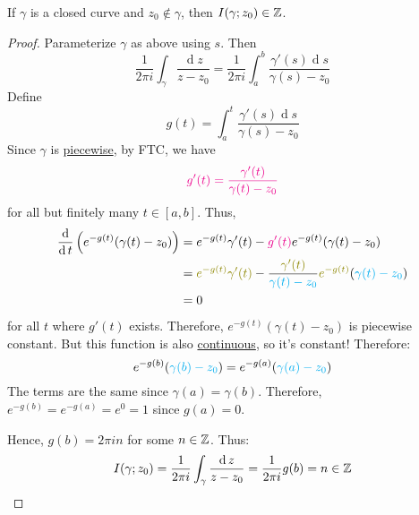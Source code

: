 \documentclass[12pt]{article}
\renewcommand{\d}{\ensuremath{\operatorname{d}}}
\begin{document}
\begin{lemma}
    If $\gamma$ is a closed curve and $z_0\notin \gamma$, then $I(\gamma;z_0)\in \mathbb{Z}$.
\end{lemma}
\begin{proof}
    Parameterize $\gamma$ as above using $s$. Then \[\frac{1}{2\pi i}\int_{\gamma}\frac{\d z}{z-z_0} = \frac{1}{2\pi i}\int_{a}^{b}\frac{\gamma'(s)\d s}{\gamma(s)-z_0}\]
    Define \[g(t)=\int_{a}^{t}\frac{\gamma'(s)\d s}{\gamma(s)-z_0}\]
    Since $\gamma$ is \underline{piecewise}, by FTC, we have \[\textcolor{magenta}{g'(t)=\frac{\gamma'(t)}{\gamma(t)-z_0}}\] for all but finitely many $t\in[a,b]$. Thus, \begin{align*}
        \frac{\d}{\d t}\left(e^{-g(t)}(\gamma(t)-z_0)\right) &= e^{-g(t)}\gamma'(t)-\rt{g'(t)}e^{-g(t)}(\gamma(t)-z_0)\\
        &= \gt{e^{-g(t)}\gamma'(t)}-\frac{\gt{\gamma'(t)}}{\bt{\gamma(t)-z_0}}\gt{e^{-g(t)}}(\bt{\gamma(t)-z_0})\\
        &= 0
    \end{align*}
    for all $t$ where $g'(t)$ exists. Therefore, $e^{-g(t)}(\gamma(t)-z_0)$ is piecewise constant. But this function is also \underline{continuous}, so it's constant! Therefore:
    \[e^{-g(b)}(\textcolor{cyan}{\gamma(b)-z_0}) = e^{-g(a)}(\textcolor{cyan}{\gamma(a)-z_0})\]
    The  terms are the same since $\gamma(a)=\gamma(b)$. Therefore, $e^{-g(b)}=e^{-g(a)}=e^0=1$ since $g(a)=0$.

    Hence, $g(b)=2\pi i n$ for some $n\in \mathbb{Z}$. Thus:\[I(\gamma;z_0)=\frac{1}{2\pi i}\int_{\gamma}\frac{\d z}{z-z_0} = \frac{1}{2\pi i}g(b) = n\in \Z\]
\end{proof}
\end{document}
